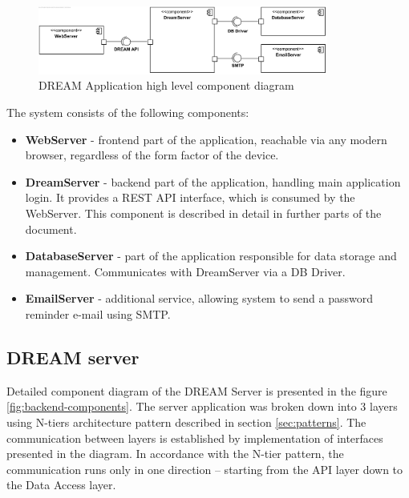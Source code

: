 \begin{figure}[H]
    \centering
    \includegraphics[width=0.85\textwidth]{diagrams/component/High Level Overview.png}
    \caption{DREAM Application high level component diagram}
    \label{fig:high-level-components}
\end{figure}

The system consists of the following components:
\begin{itemize}
    \item \textbf{WebServer} - frontend part of the application, reachable via any modern browser, regardless of the form factor of the device.
    \item \textbf{DreamServer} - backend part of the application, handling main application login. It provides a REST API \cite{rest} interface, which is consumed by the WebServer. This component is described in detail in further parts of the document.
    \item \textbf{DatabaseServer} - part of the application responsible for data storage and management. Communicates with DreamServer via a DB Driver.
    \item \textbf{EmailServer} - additional service, allowing system to send a password reminder e-mail using SMTP.
\end{itemize}

\subsection{DREAM server}\label{subsec:backend-components}
Detailed component diagram of the DREAM Server is presented in the figure \ref{fig:backend-components}. The server application was broken down into 3 layers using N-tiers architecture pattern described in section \ref{sec:patterns}. The communication between layers is established by implementation of interfaces presented in the diagram. In accordance with the N-tier pattern, the communication runs only in one direction – starting from the API layer down to the Data Access layer. 

